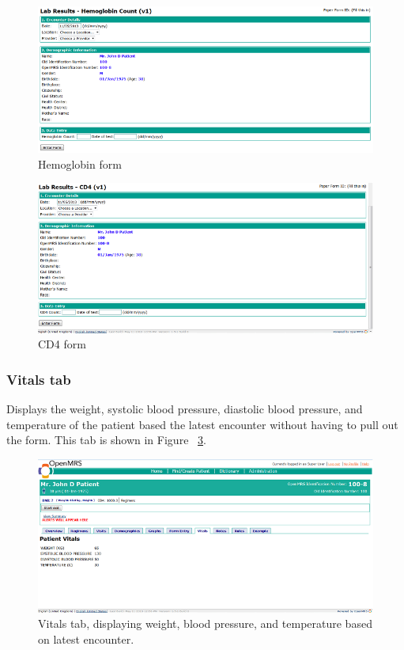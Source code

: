 \documentclass[12pt,letterpaper]{article}
\begin{document}
\begin{figure}[htbp]
\begin{center}
\includegraphics[width=6.5in]{user_guide/hemoglobin_form.png}
\end{center}
\caption{Hemoglobin form}
\label{fig:HEMOGLOBIN_FORM}
\end{figure}

\begin{figure}[htbp]
\begin{center}
\includegraphics[width=6.5in]{user_guide/cd4_form.png}
\end{center}
\caption{CD4 form}
\label{fig:CD4_FORM}
\end{figure}

\newpage
\subsubsection{Vitals tab}
	Displays the weight, systolic blood pressure, diastolic blood pressure, and temperature of the patient based the latest encounter without having to pull out the form. This tab is 
shown in Figure ~\ref{fig:VITALS_TAB}.

\begin{figure}[htbp]
\begin{center}
\includegraphics[width=6.5in]{user_guide/vitals_tab.png}
\end{center}
\caption{Vitals tab, displaying weight, blood pressure, and temperature 
based on latest encounter.}
\label{fig:VITALS_TAB}
\end{figure}
\end{document}
